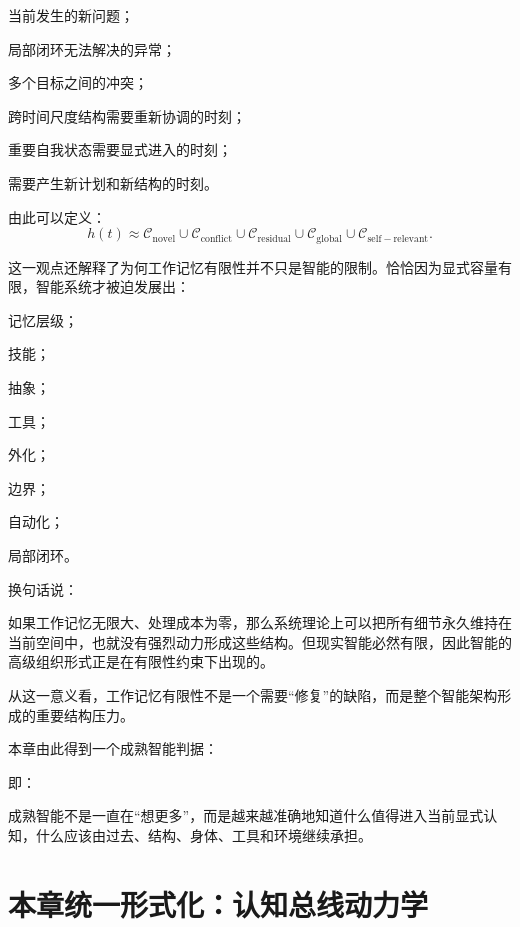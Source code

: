当前发生的新问题；

局部闭环无法解决的异常；

多个目标之间的冲突；

跨时间尺度结构需要重新协调的时刻；

重要自我状态需要显式进入的时刻；

需要产生新计划和新结构的时刻。

由此可以定义：
\[
h(t)
\approx
\mathcal C_{\mathrm{novel}}
\cup
\mathcal C_{\mathrm{conflict}}
\cup
\mathcal C_{\mathrm{residual}}
\cup
\mathcal C_{\mathrm{global}}
\cup
\mathcal C_{\mathrm{self-relevant}}.
\]

这一观点还解释了为何工作记忆有限性并不只是智能的限制。恰恰因为显式容量有限，智能系统才被迫发展出：

记忆层级；

技能；

抽象；

工具；

外化；

边界；

自动化；

局部闭环。

换句话说：
\begin{statementbox}
\centering
{}
\end{statementbox}

如果工作记忆无限大、处理成本为零，那么系统理论上可以把所有细节永久维持在当前空间中，也就没有强烈动力形成这些结构。但现实智能必然有限，因此智能的高级组织形式正是在有限性约束下出现的。

从这一意义看，工作记忆有限性不是一个需要“修复”的缺陷，而是整个智能架构形成的重要结构压力。

本章由此得到一个成熟智能判据：
\begin{statementbox}
\centering
{}
\end{statementbox}
即：
\begin{statementbox}
成熟智能不是一直在“想更多”，而是越来越准确地知道什么值得进入当前显式认知，什么应该由过去、结构、身体、工具和环境继续承担。
\end{statementbox}

\section{本章统一形式化：认知总线动力学}

